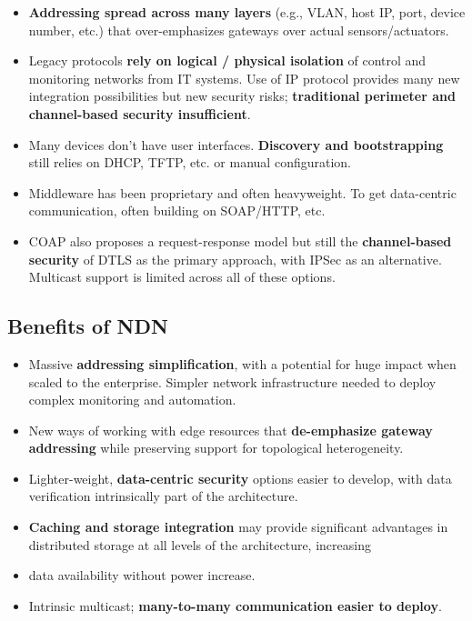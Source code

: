 \begin{itemize}
\item \textbf{Addressing spread across many layers} (e.g., VLAN, host IP, port, device number, etc.) that over-emphasizes gateways over actual sensors/actuators.  
\item Legacy protocols \textbf{rely on logical / physical isolation} of control and monitoring networks from IT systems. Use of IP protocol provides many new integration possibilities but new security risks;  \textbf{traditional perimeter and channel-based security insufficient}. 
\item Many devices don’t have user interfaces. \textbf{Discovery and bootstrapping} still relies on DHCP, TFTP, etc. or manual configuration. 
\item Middleware has been proprietary and often heavyweight.  To get data-centric communication, often building on SOAP/HTTP, etc. 
\item COAP also proposes a request-response model but still the \textbf{channel-based security} of DTLS as the primary approach, with IPSec as an alternative.    Multicast support is limited across all of these options. 
\end{itemize}

\subsection{Benefits of NDN}

\begin{itemize}
\item Massive \textbf{addressing simplification}, with a potential for huge impact when scaled to the enterprise. Simpler network infrastructure needed to deploy complex monitoring and automation. 
\item New ways of working with edge resources that \textbf{de-emphasize gateway addressing} while preserving support for topological heterogeneity. 
\item Lighter-weight, \textbf{data-centric security} options easier to develop, with data verification intrinsically part of the architecture. 
\item \textbf{Caching and storage integration} may provide significant advantages in distributed storage at all levels of the architecture, increasing \item data availability without power increase. 
\item Intrinsic multicast; \textbf{many-to-many communication easier to deploy}. 
\end{itemize}

